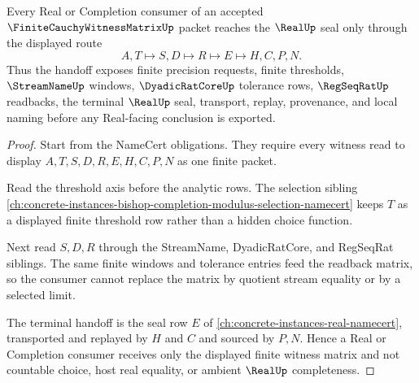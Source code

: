 \begin{theorem}
\label{thm:finite-cauchy-witness-matrix-real-handoff}
Every Real or Completion consumer of an accepted $\FiniteCauchyWitnessMatrixUp$ packet reaches the $\RealUp$ seal only through the displayed route
$$
A,T \longmapsto S,D \longmapsto R \longmapsto E \longmapsto H,C,P,N .
$$
Thus the handoff exposes finite precision requests, finite thresholds, $\StreamNameUp$ windows, $\DyadicRatCoreUp$ tolerance rows, $\RegSeqRatUp$ readbacks, the terminal $\RealUp$ seal, transport, replay, provenance, and local naming before any Real-facing conclusion is exported.
\end{theorem}
\begin{proof}
Start from the NameCert obligations. They require every witness read to display $A,T,S,D,R,E,H,C,P,N$ as one finite packet.

Read the threshold axis before the analytic rows. The selection sibling \autoref{ch:concrete-instances-bishop-completion-modulus-selection-namecert} keeps $T$ as a displayed finite threshold row rather than a hidden choice function.

Next read $S,D,R$ through the StreamName, DyadicRatCore, and RegSeqRat siblings. The same finite windows and tolerance entries feed the readback matrix, so the consumer cannot replace the matrix by quotient stream equality or by a selected limit.

The terminal handoff is the seal row $E$ of \autoref{ch:concrete-instances-real-namecert}, transported and replayed by $H$ and $C$ and sourced by $P,N$. Hence a Real or Completion consumer receives only the displayed finite witness matrix and not countable choice, host real equality, or ambient $\RealUp$ completeness.
\end{proof}



